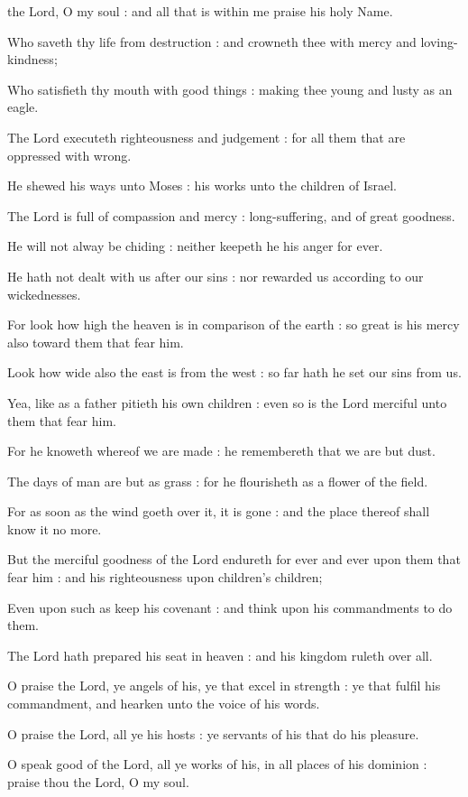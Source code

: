  the Lord, O my soul : and all that is within me praise his holy Name.\par
{}
Who saveth thy life from destruction : and crowneth thee with mercy and loving-kindness;\par
{}Who satisfieth thy mouth with good things : making thee young and lusty as an eagle.\par
{}The Lord executeth righteousness and judgement : for all them that are oppressed with wrong.\par
{}He shewed his ways unto Moses : his works unto the children of Israel.\par
{}The Lord is full of compassion and mercy : long-suffering, and of great goodness.\par
{}He will not alway be chiding : neither keepeth he his anger for ever.\par
{}He hath not dealt with us after our sins : nor rewarded us according to our wickednesses.\par
{}For look how high the heaven is in comparison of the earth : so great is his mercy also toward them that fear him.\par
{}Look how wide also the east is from the west : so far hath he set our sins from us.\par
{}Yea, like as a father pitieth his own children : even so is the Lord merciful unto them that fear him.\par
{}For he knoweth whereof we are made : he remembereth that we are but dust.\par
{}The days of man are but as grass : for he flourisheth as a flower of the field.\par
{}For as soon as the wind goeth over it, it is gone : and the place thereof shall know it no more.\par
{}But the merciful goodness of the Lord endureth for ever and ever upon them that fear him : and his righteousness upon children's children;\par
{}Even upon such as keep his covenant : and think upon his commandments to do them.\par
{}The Lord hath prepared his seat in heaven : and his kingdom ruleth over all.\par
{}O praise the Lord, ye angels of his, ye that excel in strength : ye that fulfil his commandment, and hearken unto the voice of his words.\par
{}O praise the Lord, all ye his hosts : ye servants of his that do his pleasure.\par
{}O speak good of the Lord, all ye works of his, in all places of his dominion : praise thou the Lord, O my soul.\par

